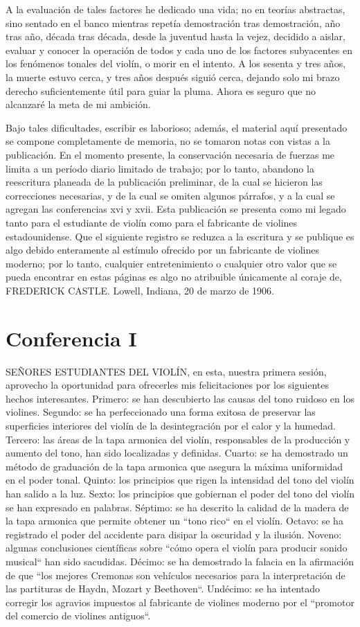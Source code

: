 \documentclass[12pt]{book}
\begin{document}
A la evaluación de tales factores he dedicado una vida; no en teorías abstractas, sino sentado en el banco mientras repetía demostración tras demostración, año tras año, década tras década, desde la juventud hasta la vejez, decidido a aislar, evaluar y conocer la operación de todos y cada uno de los factores subyacentes en los fenómenos tonales del violín, o morir en el intento. A los sesenta y tres años, la muerte estuvo cerca, y tres años después siguió cerca, dejando solo mi brazo derecho suficientemente útil para guiar la pluma. Ahora es seguro que no alcanzaré la meta de mi ambición.

Bajo tales dificultades, escribir es laborioso; además, el material aquí presentado se compone completamente de memoria, no se tomaron notas con vistas a la publicación. En el momento presente, la conservación necesaria de fuerzas me limita a un período diario limitado de trabajo; por lo tanto, abandono la reescritura planeada de la publicación preliminar, de la cual se hicieron las correcciones necesarias, y de la cual se omiten algunos párrafos, y a la cual se agregan las conferencias xvi y xvii. Esta publicación se presenta como mi legado tanto para el estudiante de violín como para el fabricante de violines estadounidense. Que el siguiente registro se reduzca a la escritura y se publique es algo debido enteramente al estímulo ofrecido por un fabricante de violines moderno; por lo tanto, cualquier entretenimiento o cualquier otro valor que se pueda encontrar en estas páginas es algo no atribuible únicamente al coraje de, FREDERICK CASTLE. Lowell, Indiana, 20 de marzo de 1906.

\chapter*{Conferencia I}
SEÑORES ESTUDIANTES DEL VIOLÍN, en esta, nuestra primera sesión, aprovecho la oportunidad para ofrecerles mis felicitaciones por los siguientes hechos interesantes. Primero: se han descubierto las causas del tono ruidoso en los violines. Segundo: se ha perfeccionado una forma exitosa de preservar las superficies interiores del violín de la desintegración por el calor y la humedad. Tercero: las áreas de la tapa armonica del violín, responsables de la producción y aumento del tono, han sido localizadas y definidas. Cuarto: se ha demostrado un método de graduación de la tapa armonica que asegura la máxima uniformidad en el poder tonal. Quinto: los principios que rigen la intensidad del tono del violín han salido a la luz. Sexto: los principios que gobiernan el poder del tono del violín se han expresado en palabras. Séptimo: se ha descrito la calidad de la madera de la tapa armonica que permite obtener un ``tono rico`` en el violín. Octavo: se ha registrado el poder del accidente para disipar la oscuridad y la ilusión. Noveno: algunas conclusiones científicas sobre ``cómo opera el violín para producir sonido musical`` han sido sacudidas. Décimo: se ha demostrado la falacia en la afirmación de que ``los mejores Cremonas son vehículos necesarios para la interpretación de las partituras de Haydn, Mozart y Beethoven``. Undécimo: se ha intentado corregir los agravios impuestos al fabricante de violines moderno por el ``promotor del comercio de violines antiguos``.
\end{document}
